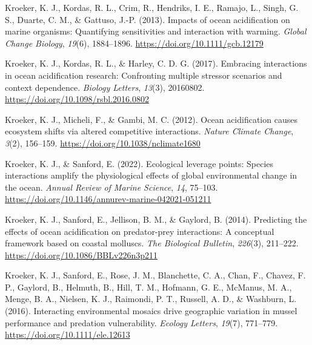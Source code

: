 \documentclass{CSUNthesis}
\begin{document}
\vspace{0.1em}

Kroeker, K. J., Kordas, R. L., Crim, R., Hendriks, I. E., Ramajo, L., Singh, G. S., Duarte, C. M., \& Gattuso, J.-P. (2013). Impacts of ocean acidification on marine organisms: Quantifying sensitivities and interaction with warming. \textit{Global Change Biology}, \textit{19}(6), 1884--1896. \url{https://doi.org/10.1111/gcb.12179}

\vspace{0.1em}

Kroeker, K. J., Kordas, R. L., \& Harley, C. D. G. (2017). Embracing interactions in ocean acidification research: Confronting multiple stressor scenarios and context dependence. \textit{Biology Letters}, \textit{13}(3), 20160802. \url{https://doi.org/10.1098/rsbl.2016.0802}

\vspace{0.1em}

Kroeker, K. J., Micheli, F., \& Gambi, M. C. (2012). Ocean acidification causes ecosystem shifts via altered competitive interactions. \textit{Nature Climate Change}, \textit{3}(2), 156--159. \url{https://doi.org/10.1038/nclimate1680}

\vspace{0.1em}

Kroeker, K. J., \& Sanford, E. (2022). Ecological leverage points: Species interactions amplify the physiological effects of global environmental change in the ocean. \textit{Annual Review of Marine Science}, \textit{14}, 75--103. \url{https://doi.org/10.1146/annurev-marine-042021-051211}

\vspace{0.1em}

Kroeker, K. J., Sanford, E., Jellison, B. M., \& Gaylord, B. (2014). Predicting the effects of ocean acidification on predator-prey interactions: A conceptual framework based on coastal molluscs. \textit{The Biological Bulletin}, \textit{226}(3), 211--222. \url{https://doi.org/10.1086/BBLv226n3p211}

\vspace{0.1em}

Kroeker, K. J., Sanford, E., Rose, J. M., Blanchette, C. A., Chan, F., Chavez, F. P., Gaylord, B., Helmuth, B., Hill, T. M., Hofmann, G. E., McManus, M. A., Menge, B. A., Nielsen, K. J., Raimondi, P. T., Russell, A. D., \& Washburn, L. (2016). Interacting environmental mosaics drive geographic variation in mussel performance and predation vulnerability. \textit{Ecology Letters}, \textit{19}(7), 771--779. \url{https://doi.org/10.1111/ele.12613}
\end{document}
